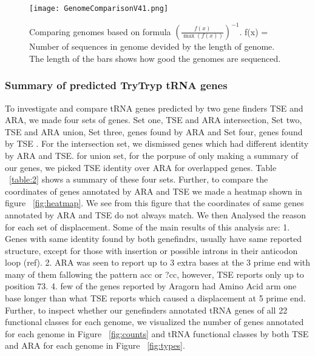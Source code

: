 \documentclass[
10pt, %
a4paper, %
oneside, %
headinclude,footinclude, %
BCOR5mm, %
]{scrartcl}
\begin{document}
\begin{figure}[tb]
\centering 
\texttt{[image: GenomeComparisonV41.png]} 
\caption[Genome Comparison]{Comparing genomes based on formula ${(\frac{f(x)}{\max(f(x))})}^{-1}$. f(x) = Number of sequences in genome devided by the length of genome. The length of the bars shows how good the genomes are sequenced.} %
\label{fig:gallery} 
\end{figure}

\subsubsection*{Summary of predicted TryTryp tRNA genes}
To investigate and compare tRNA genes predicted by two gene finders TSE and ARA, we made four sets of genes. Set one, TSE and ARA intersection, Set two, TSE and ARA union, Set three, genes found by ARA and Set four, genes found by TSE . For the intersection set, we dismissed genes which had different identity by ARA and TSE. for union set, for the porpuse of only making a summary of our genes, we picked TSE identity over ARA for overlapped genes. Table  ~\ref{table:2} shows a summary of these four sets. Further, to compare the coordinates of genes annotated by ARA and TSE we made a heatmap shown in figure ~\ref{fig:heatmap}. We see from this figure that the coordinates of same genes annotated by ARA and TSE do not always match. We then Analysed the reason for each set of displacement. Some of the main results of this analysis are:
1. Genes with same identity found by both genefindrs, usually have same reported structure, except for those with insertion or possible introns in their anticodon loop (ref). 2. ARA was seen to report up to 3 extra bases at the 3 prime end with many of them fallowing the pattern acc or ?cc, however, TSE reports only up to position 73. 4. few of the genes reported by Aragorn had Amino Acid arm one base longer than what TSE reports which caused a displacement at 5 prime end.
Further, to inspect whether our genefinders annotated tRNA genes of all 22 functional classes for each genome, we visualized the number of genes annotated for each genome in Figure ~\ref{fig:counts} and tRNA functional classes 	 by both TSE and ARA for each genome in Figure ~\ref{fig:types}.
\end{document}
